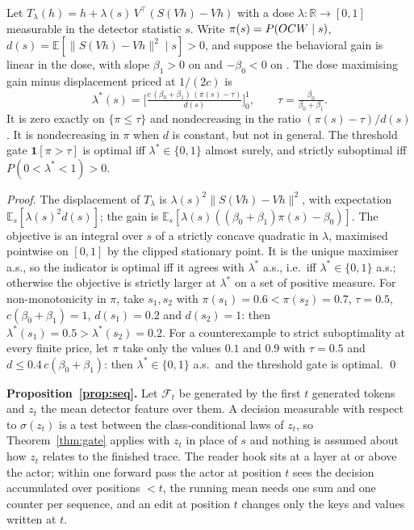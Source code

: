 \begin{proposition}
\label{prop:dose}
Let $T_\lambda(h)=h+\lambda(s)\,V^\top(S(Vh)-Vh)$ with a dose
$\lambda:\mathbb{R}\to[0,1]$ measurable in the detector statistic $s$. Write
$\pi(s)=P(OCW\mid s)$, $d(s)=\mathbb{E}[\lVert S(Vh)-Vh\rVert^2\mid s]>0$, and
suppose the behavioral gain is linear in the dose, with slope $\beta_1>0$ on
\ocw{} and $-\beta_0<0$ on \crok{}. The dose maximising gain minus
displacement priced at $1/(2c)$ is
\[
\lambda^*(s)=\Big[\tfrac{c\,(\beta_0+\beta_1)\,(\pi(s)-\tau)}{d(s)}\Big]_0^1,\qquad
\tau=\tfrac{\beta_0}{\beta_0+\beta_1}.
\]
It is zero exactly on $\{\pi\le\tau\}$ and nondecreasing in the ratio
$(\pi(s)-\tau)/d(s)$. It is nondecreasing in $\pi$ when $d$ is constant, but
not in general. The threshold gate $\mathbf{1}[\pi>\tau]$ is optimal iff
$\lambda^*\in\{0,1\}$ almost surely, and strictly suboptimal iff
$P(0<\lambda^*<1)>0$.
\end{proposition}

\emph{Proof.} The displacement of $T_\lambda$ is
$\lambda(s)^2\lVert S(Vh)-Vh\rVert^2$, with expectation
$\mathbb{E}_s[\lambda(s)^2d(s)]$; the gain is
$\mathbb{E}_s[\lambda(s)((\beta_0+\beta_1)\pi(s)-\beta_0)]$. The objective is
an integral over $s$ of a strictly concave quadratic in $\lambda$, maximised
pointwise on $[0,1]$ by the clipped stationary point. It is the unique
maximiser a.s., so the indicator is optimal iff it agrees with $\lambda^*$
a.s., i.e.\ iff $\lambda^*\in\{0,1\}$ a.s.; otherwise the objective is strictly
larger at $\lambda^*$ on a set of positive measure. For non-monotonicity in
$\pi$, take $s_1,s_2$ with $\pi(s_1)=0.6<\pi(s_2)=0.7$, $\tau=0.5$,
$c(\beta_0+\beta_1)=1$, $d(s_1)=0.2$ and $d(s_2)=1$: then
$\lambda^*(s_1)=0.5>\lambda^*(s_2)=0.2$. For a counterexample to strict
suboptimality at every finite price, let $\pi$ take only the values $0.1$ and
$0.9$ with $\tau=0.5$ and $d\le0.4\,c(\beta_0+\beta_1)$: then
$\lambda^*\in\{0,1\}$ a.s.\ and the threshold gate is optimal. \qed

\textbf{Proposition~\ref{prop:seq}.} Let $\mathcal{F}_t$ be generated by the first $t$
generated tokens and $z_t$ the mean detector feature over them. A decision
measurable with respect to $\sigma(z_t)$ is a test between the
class-conditional laws of $z_t$, so Theorem~\ref{thm:gate} applies with $z_t$
in place of $s$ and nothing is assumed about how $z_t$ relates to the finished
trace. The reader hook sits at a layer at or above the actor; within one
forward pass the actor at position $t$ sees the decision accumulated over
positions $<t$, the running mean needs one sum and one counter per sequence,
and an edit at position $t$ changes only the keys and values written at $t$.

